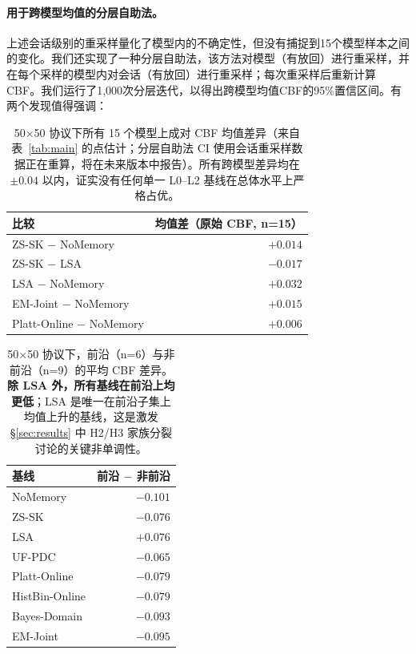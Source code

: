 \documentclass[11pt,a4paper,fontset=fandol]{ctexart}
\begin{document}
\paragraph{用于跨模型均值的分层自助法。} 上述会话级别的重采样量化了模型内的不确定性，但没有捕捉到15个模型样本之间的变化。我们还实现了一种分层自助法，该方法对模型（有放回）进行重采样，并在每个采样的模型内对会话（有放回）进行重采样；每次重采样后重新计算CBF。我们运行了1,000次分层迭代，以得出跨模型均值CBF的95\%置信区间。有两个发现值得强调：

\begin{table}[h]
\centering
\small
\caption{50$\times$50 协议下所有 15 个模型上成对 CBF 均值差异（来自表~\ref{tab:main} 的点估计；分层自助法 CI 使用会话重采样数据正在重算，将在未来版本中报告）。所有跨模型差异均在 $\pm 0.04$ 以内，证实没有任何单一 L0--L2 基线在总体水平上严格占优。}
\label{tab:boot_pairs}
\begin{tabular}{l r}
\toprule
\textbf{比较} & \textbf{均值差（原始 CBF, n=15）} \\
\midrule
ZS-SK $-$ NoMemory      & $+0.014$ \\
ZS-SK $-$ LSA & $-0.017$ \\
LSA $-$ NoMemory    & $+0.032$ \\
EM-Joint $-$ NoMemory         & $+0.015$ \\
Platt-Online $-$ NoMemory     & $+0.006$ \\
\bottomrule
\end{tabular}
\end{table}

\begin{table}[h]
\centering
\small
\caption{50$\times$50 协议下，前沿（n=6）与非前沿（n=9）的平均 CBF 差异。\textbf{除 LSA 外，所有基线在前沿上均更低}；LSA 是唯一在前沿子集上均值上升的基线，这是激发 \S\ref{sec:results} 中 H2/H3 家族分裂讨论的关键非单调性。}
\label{tab:boot_frontier}
\begin{tabular}{l r}
\toprule
\textbf{基线} & \textbf{前沿 $-$ 非前沿} \\
\midrule
NoMemory       & $-0.101$ \\
ZS-SK    & $-0.076$ \\
LSA  & $+0.076$ \\
UF-PDC         & $-0.065$ \\
Platt-Online   & $-0.079$ \\
HistBin-Online & $-0.079$ \\
Bayes-Domain   & $-0.093$ \\
EM-Joint       & $-0.095$ \\
\bottomrule
\end{tabular}
\end{table}
\end{document}
